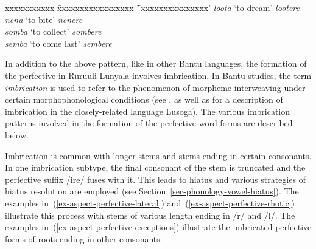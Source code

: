 \ea \label{ex-aspect-perfective-ere}
\begin{tabbing}
xxxxxxxxxxx \= xxxxxxxxxxxxxxxxx \=`xxxxxxxxxxxxxxx'\kill
    \textit{loota}	\>`to dream'\>	\textit{lootere}\\
    \textit{nena}	\>	`to bite'\>	\textit{nenere}\\
    \textit{somba}	\>`to collect'\> \textit{sombere}\\
    \textit{semba}	\> `to come last'\> \textit{sembere}
\end{tabbing}
\z

In addition to the above pattern, 
like in other Bantu languages, the formation of the perfective in Ruruuli-Lunyala involves imbrication. 
In Bantu studies, the term \textit{imbrication} is used to refer to the phenomenon of morpheme interweaving under certain morphophonological conditions (see \citealt{Bastin1983Finale, Hyman1995Minimality}, as well as \citet{Hymanetal2017Multiple} for a description of imbrication in the closely-related language Lusoga). 
The various imbrication patterns involved in the formation of the perfective word-forms are described below.

\newpage
Imbrication is common with longer stems and stems ending in certain consonants. 
In one imbrication subtype, the final consonant of the stem is truncated and the perfective suffix /ire/ fuses with it.
This leads to hiatus and various strategies of hiatus resolution are employed (see Section~\ref{sec-phonology-vowel-hiatus}). 
The examples in~(\ref{ex-aspect-perfective-lateral}) and~(\ref{ex-aspect-perfective-rhotic}) illustrate this process with stems of various length ending in /r/ and /l/. 
The examples in~(\ref{ex-aspect-perfective-exceptions}) illustrate the imbricated perfective forms of roots ending in other consonants. 

